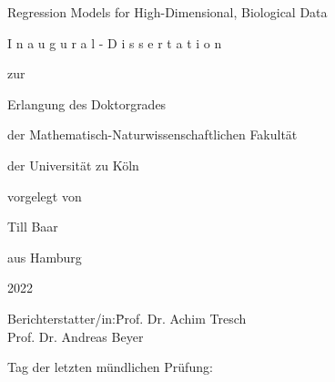 
\begin{center}\large{

Regression Models for High-Dimensional, Biological Data

\vspace{3\baselineskip}
\begin{otherlanguage}{german}

I n a u g u r a l - D i s s e r t a t i o n

\vspace{1.5\baselineskip}

zur

\vspace{1.5\baselineskip}

Erlangung des Doktorgrades

\vspace{1.5\baselineskip}

der Mathematisch-Naturwissenschaftlichen Fakultät

\vspace{1.5\baselineskip}

der Universität zu Köln

\vspace{1.5\baselineskip}

vorgelegt von

\vspace{1.5\baselineskip}

Till Baar

\vspace{1.5\baselineskip}

aus Hamburg

\vspace{1.5\baselineskip}

2022

\end{otherlanguage}
}\end{center}

\clearpage

\large{

\begin{tabbing}
Berichterstatter/in:\qquad \= Prof. Dr. Achim Tresch \\[1.5\baselineskip]
                           \> Prof. Dr. Andreas Beyer
\end{tabbing}

\vspace{3\baselineskip}

\noindent Tag der letzten mündlichen Prüfung:

}

\restoregeometry